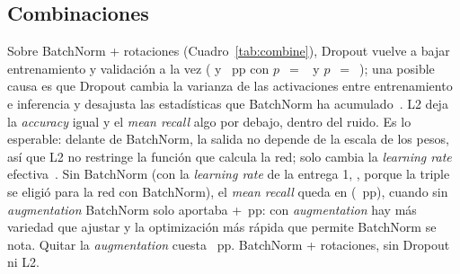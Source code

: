 \begin{table}[h]
  \centering
  \caption{\emph{Data augmentation} sobre el modelo con BatchNorm ( semillas por fila; paciencias de
   y  épocas).}
  \label{tab:aug}
\end{table}

\begin{figure}[!htbp]
  \centering
  \begin{minipage}[t]{0.485\linewidth}
    \centering
    \caption{}
    \label{fig:bn}
  \end{minipage}\hfill
  \begin{minipage}[t]{0.485\linewidth}
    \centering
    \caption{}
    \label{fig:aug}
  \end{minipage}
\end{figure}

\subsection{Combinaciones}\label{sec:combine}
{Sobre BatchNorm + rotaciones (Cuadro~\ref{tab:combine}), Dropout vuelve a bajar entrenamiento y validación a la vez
( y ~pp con $p$~$=$~ y
$p$~$=$~); una posible causa es que Dropout cambia la varianza de las activaciones entre
entrenamiento e inferencia y desajusta las estadísticas que BatchNorm ha acumulado~\cite{li2019}. L2 deja la
\emph{accuracy} igual y el \emph{mean recall} algo por debajo, dentro del ruido. Es lo esperable: delante de
BatchNorm, la salida no depende de la escala de los pesos, así que L2 no restringe la función que calcula la red;
solo cambia la \emph{learning rate} efectiva~\cite{laarhoven}.}
{Sin BatchNorm (con la \emph{learning rate} de la entrega 1, , porque la triple se eligió para la
red con BatchNorm), el \emph{mean recall} queda en  (~pp), cuando sin
\emph{augmentation} BatchNorm solo aportaba +~pp: con
\emph{augmentation} hay más variedad que ajustar y la optimización más rápida que permite BatchNorm se nota. Quitar la
\emph{augmentation} cuesta ~pp.}
{BatchNorm + rotaciones, sin Dropout ni L2.}

